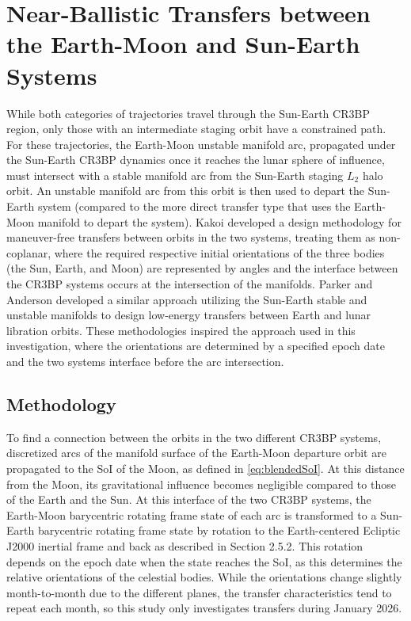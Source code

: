 \section{Near-Ballistic Transfers between the Earth-Moon and Sun-Earth Systems}
While both categories of trajectories travel through the Sun-Earth CR3BP region, only those with an
intermediate staging orbit have a constrained path. For these trajectories, the Earth-Moon unstable
manifold arc, propagated under the Sun-Earth CR3BP dynamics once it reaches the lunar sphere of
influence, must intersect with a stable manifold arc from the Sun-Earth staging $L_{2}$ halo orbit.
An unstable manifold arc from this orbit is then used to depart the Sun-Earth system (compared to
the more direct transfer type that uses the Earth-Moon manifold to depart the system). Kakoi
developed a design methodology for maneuver-free transfers between orbits in the two systems,
treating them as non-coplanar, where the required respective initial orientations of the three
bodies (the Sun, Earth, and Moon) are represented by angles and the interface between the CR3BP
systems occurs at the intersection of the manifolds\cite{Kakoi:2014,Kakoi:2015}. Parker and
Anderson developed a similar approach utilizing the Sun-Earth stable and unstable manifolds to
design low-energy transfers between Earth and lunar libration orbits\cite{Parker:2013}. These
methodologies inspired the approach used in this investigation, where the orientations are
determined by a specified epoch date and the two systems interface before the arc intersection.

\subsection{Methodology}
To find a connection between the orbits in the two different CR3BP systems, discretized arcs of the
manifold surface of the Earth-Moon departure orbit are propagated to the SoI of the Moon, as
defined in \cref{eq:blendedSoI}. At this distance from the Moon, its gravitational influence
becomes negligible compared to those of the Earth and the Sun. At this interface of the two CR3BP
systems, the Earth-Moon barycentric rotating frame state of each arc is transformed to a Sun-Earth
barycentric rotating frame state by rotation to the Earth-centered Ecliptic J2000 inertial frame
and back as described in Section 2.5.2. This rotation depends on the epoch date when the state
reaches the SoI, as this determines the relative orientations of the celestial bodies. While the
orientations change slightly month-to-month due to the different planes, the transfer
characteristics tend to repeat each month, so this study only investigates transfers during January
2026\cite{Parker:2013}.

